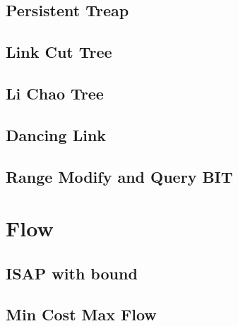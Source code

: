 \documentclass[a4paper,10pt,twocolumn,oneside]{article}
\begin{document}
\subsection{Persistent Treap}


%

\subsection{Link Cut Tree}


\subsection{Li Chao Tree}


%

\subsection{Dancing Link}


\subsection{Range Modify and Query BIT}


\section{Flow}
\subsection{ISAP with bound}


\subsection{Min Cost Max Flow}

\end{document}

